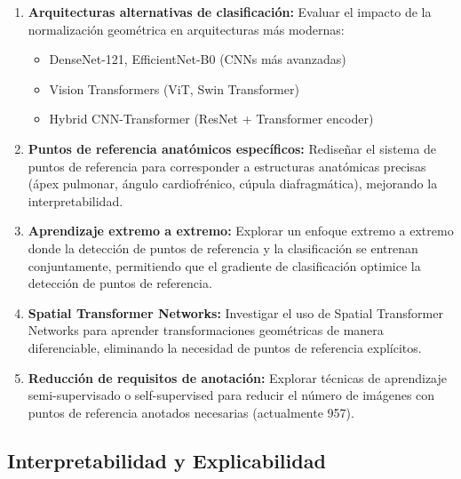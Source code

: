 \begin{enumerate}
    \item \textbf{Arquitecturas alternativas de clasificación:} Evaluar el impacto de la normalización geométrica en arquitecturas más modernas:
    \begin{itemize}
        \item DenseNet-121, EfficientNet-B0 (CNNs más avanzadas)
        \item Vision Transformers (ViT, Swin Transformer)
        \item Hybrid CNN-Transformer (ResNet + Transformer encoder)
    \end{itemize}

    \item \textbf{Puntos de referencia anatómicos específicos:} Rediseñar el sistema de puntos de referencia para corresponder a estructuras anatómicas precisas (ápex pulmonar, ángulo cardiofrénico, cúpula diafragmática), mejorando la interpretabilidad.

    \item \textbf{Aprendizaje extremo a extremo:} Explorar un enfoque extremo a extremo donde la detección de puntos de referencia y la clasificación se entrenan conjuntamente, permitiendo que el gradiente de clasificación optimice la detección de puntos de referencia.

    \item \textbf{Spatial Transformer Networks:} Investigar el uso de Spatial Transformer Networks \cite{jaderberg2015spatial} para aprender transformaciones geométricas de manera diferenciable, eliminando la necesidad de puntos de referencia explícitos.

    \item \textbf{Reducción de requisitos de anotación:} Explorar técnicas de aprendizaje semi-supervisado o self-supervised para reducir el número de imágenes con puntos de referencia anotados necesarias (actualmente 957).
\end{enumerate}

\subsection{Interpretabilidad y Explicabilidad}
\label{subsec:trabajos_futuros_interpretabilidad}

